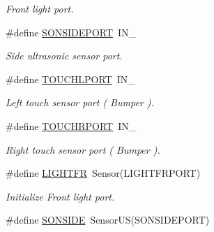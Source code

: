 \begin{DoxyCompactItemize}
\begin{DoxyCompactList}\small\item\em Front light port. \item\end{DoxyCompactList}\item 
\hypertarget{fence_8nxc_a73b327cc697b593b06f47bc6915ba9cf}{
\#define \hyperlink{fence_8nxc_a73b327cc697b593b06f47bc6915ba9cf}{SONSIDEPORT}~IN\_}
\label{fence_8nxc_a73b327cc697b593b06f47bc6915ba9cf}

\begin{DoxyCompactList}\small\item\em Side ultrasonic sensor port. \item\end{DoxyCompactList}\item 
\hypertarget{fence_8nxc_a867a2479cd5e144bc98b3e24bd48a79c}{
\#define \hyperlink{fence_8nxc_a867a2479cd5e144bc98b3e24bd48a79c}{TOUCHLPORT}~IN\_}
\label{fence_8nxc_a867a2479cd5e144bc98b3e24bd48a79c}

\begin{DoxyCompactList}\small\item\em Left touch sensor port ( Bumper ). \item\end{DoxyCompactList}\item 
\hypertarget{fence_8nxc_ac16330478e7b003e00f37e90e0c5bdf6}{
\#define \hyperlink{fence_8nxc_ac16330478e7b003e00f37e90e0c5bdf6}{TOUCHRPORT}~IN\_}
\label{fence_8nxc_ac16330478e7b003e00f37e90e0c5bdf6}

\begin{DoxyCompactList}\small\item\em Right touch sensor port ( Bumper ). \item\end{DoxyCompactList}\item 
\hypertarget{fence_8nxc_a26fd581a2d8a8f58a30535495c8d0843}{
\#define \hyperlink{fence_8nxc_a26fd581a2d8a8f58a30535495c8d0843}{LIGHTFR}~Sensor(LIGHTFRPORT)}
\label{fence_8nxc_a26fd581a2d8a8f58a30535495c8d0843}

\begin{DoxyCompactList}\small\item\em Initialize Front light port. \item\end{DoxyCompactList}\item 
\hypertarget{fence_8nxc_aec1d71dea61f39acce761840c4ce0d27}{
\#define \hyperlink{fence_8nxc_aec1d71dea61f39acce761840c4ce0d27}{SONSIDE}~SensorUS(SONSIDEPORT)}
\label{fence_8nxc_aec1d71dea61f39acce761840c4ce0d27}


\end{DoxyCompactItemize}
